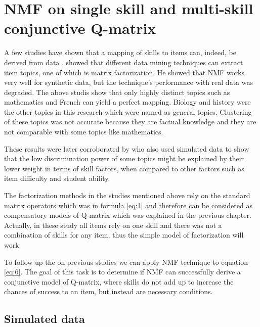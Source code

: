 \section{NMF on single skill and multi-skill conjunctive Q-matrix}
\label{ITS2012}

A few studies have shown that a mapping of skills to items can, indeed, be derived from data \citep{winters2006,desmarais2011conditions}. \citet{Winters2006} showed that different data mining techniques can extract item topics, one of which is matrix factorization. He showed that NMF works very well for synthetic data, but the technique's performance with real data was degraded. The above studis show that only highly distinct topics such as mathematics and French can yield a perfect mapping. Biology and history were the other topics in this research which were named as general topics. Clustering of these topics was not accurate because they are factual knowledge and they are not comparable with some topics like mathematics.

These results were later corroborated by \citet{desmarais2011conditions} who also used simulated data to show that the low discrimination power of some topics might be explained by their lower weight in terms of skill factors, when compared to other factors such as item difficulty and student ability.

The factorization methods in the studies mentioned above rely on the standard matrix operators which was in formula \ref{eq:1} and therefore can be considered as compensatory models of Q-matrix which was explained in the previous chapter. Actually, in these study all items rely on one skill and there was not a combination of skills for any item, thus the simple model of factorization will work. 

To follow up the on previous studies \citep{Barnes2005,desmarais2011conditions,Winters07} we can apply NMF technique to equation \ref{eq:6}. The goal of this task is to determine if NMF can successfully derive a conjunctive model of Q-matrix, where skills do not add up to increase the chances of success to an item, but instead are necessary conditions.


\subsection{Simulated data}


